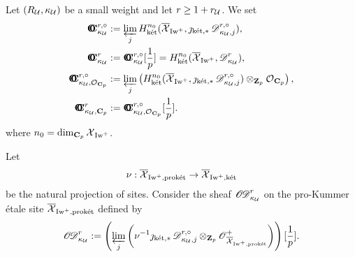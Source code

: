\begin{Definition}\label{Definition: simple notations for overconvergent cohomologies}
Let $(R_{\operatorname{\mathcal{U}}}, \kappa_{\operatorname{\mathcal{U}}})$ be a small weight and let $r\geq 1+r_{\operatorname{\mathcal{U}}}$. We set \begin{align*}
    \OC_{\kappa_{\calU}}^{r, \circ} & := \varprojlim_{j} H_{\ket}^{n_0}(\overline{\calX}_{\Iw^+}, \jmath_{\ket, *}\scrD_{\kappa_{\calU}, j}^{r, \circ}),\\
    \OC_{\kappa_{\calU}}^{r} & := \OC_{\kappa_{\calU}}^{r, \circ}[\frac{1}{p}]=H_{\ket}^{n_0}(\overline{\calX}_{\Iw^+}, \scrD_{\kappa_{\calU}}^r),\\
    \OC_{\kappa_{\calU}, \calO_{\C_p}}^{r, \circ} & := \varprojlim_{j}\left(H_{\ket}^{n_0}(\overline{\calX}_{\Iw^+}, \jmath_{\ket, *}\scrD_{\kappa_{\calU}, j}^{r, \circ})\otimes_{\Z_p}\calO_{\C_p}\right),\\
    \OC_{\kappa_{\calU}, \C_p}^{r} & := \OC_{\kappa_{\calU}, \calO_{\C_p}}^{r, \circ}[\frac{1}{p}].
\end{align*}
where $n_0=\dim_{\operatorname{\mathbf{C}}_p}\operatorname{\mathcal{X}}_{\operatorname{Iw}^+}$.
\end{Definition}

Let \[\nu: \overline{\operatorname{\mathcal{X}}}_{\operatorname{Iw}^+, \operatorname{\textrm{prok\'{e}t}}}\rightarrow \overline{\operatorname{\mathcal{X}}}_{\operatorname{Iw}^+, \operatorname{\textrm{k\'{e}t}}}\] be the natural projection of sites. Consider the sheaf $\operatorname{\operatorname{\mathscr{O}}\!\!\operatorname{\mathscr{D}}}_{\kappa_{\operatorname{\mathcal{U}}}}^r$ on the pro-Kummer \'{e}tale site $\overline{\operatorname{\mathcal{X}}}_{\operatorname{Iw}^+, \operatorname{\textrm{prok\'{e}t}}}$ defined by $$\operatorname{\operatorname{\mathscr{O}}\!\!\operatorname{\mathscr{D}}}_{\kappa_{\operatorname{\mathcal{U}}}}^r:=\left(\varprojlim_{j}\left(\nu^{-1}\jmath_{\operatorname{\textrm{k\'{e}t}}, *}\operatorname{\mathscr{D}}_{\kappa_{\operatorname{\mathcal{U}}}, j}^{r, \circ}\otimes_{\operatorname{\mathbf{Z}}_p}\operatorname{\mathscr{O}}_{\overline{\operatorname{\mathcal{X}}}_{\operatorname{Iw}^+, \operatorname{\textrm{prok\'{e}t}}}}^+\right)\right)[\frac{1}{p}].$$ 

